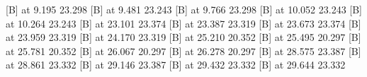{{} [B] at  9.195 23.298
%
%
 [B] at  9.481 23.243
%
%
 [B] at  9.766 23.298
%
%
 [B] at 10.052 23.243
%
%
 [B] at 10.264 23.243
%
%
 [B] at 23.101 23.374
%
%
 [B] at 23.387 23.319
%
%
 [B] at 23.673 23.374
%
%
 [B] at 23.959 23.319
%
%
 [B] at 24.170 23.319
%
%
 [B] at 25.210 20.352
%
%
 [B] at 25.495 20.297
%
%
 [B] at 25.781 20.352
%
%
 [B] at 26.067 20.297
%
%
 [B] at 26.278 20.297
%
%
 [B] at 28.575 23.387
%
%
 [B] at 28.861 23.332
%
%
 [B] at 29.146 23.387
%
%
 [B] at 29.432 23.332
%
%
 [B] at 29.644 23.332
%
%
}
